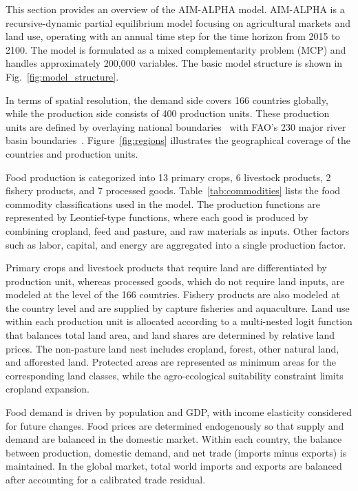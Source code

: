This section provides an overview of the AIM-ALPHA model. AIM-ALPHA is a recursive-dynamic partial equilibrium model 
focusing on agricultural markets and land use, operating with an annual time step for the time horizon from 2015 to 2100.
The model is formulated as a mixed complementarity problem (MCP) and handles approximately 200,000 variables. 
The basic model structure is shown in Fig.~\ref{fig:model_structure}.

In terms of spatial resolution, the demand side covers 166 countries globally, while the production side consists of 400 production units. 
These production units are defined by overlaying national boundaries~\cite{worldbankWorldBankOfficial2025} with FAO's 230 major river basin boundaries~\cite{faolandandwaterdivisionMajorHydrologicalBasins2011}. 
Figure~\ref{fig:regions} illustrates the geographical coverage of the countries and production units.

Food production is categorized into 13 primary crops, 6 livestock products, 2 fishery products, and 7 processed goods. Table~\ref{tab:commodities} lists the food commodity classifications used in the model. 
The production functions are represented by Leontief-type functions, where each good is produced by combining cropland, feed and pasture, 
and raw materials as inputs. Other factors such as labor, capital, and energy are aggregated into a single production factor. 

Primary crops and livestock products that require land are differentiated by production unit, whereas processed goods, which do not require 
land inputs, are modeled at the level of the 166 countries. Fishery products are also modeled at the country level and are supplied by capture fisheries and aquaculture. Land use within each production unit is allocated according to a multi-nested 
logit function that balances total land area, and land shares are determined by relative land prices. The non-pasture land nest includes
cropland, forest, other natural land, and afforested land. Protected areas are represented as minimum areas for the corresponding land classes,
while the agro-ecological suitability constraint limits cropland expansion.

Food demand is driven by population and GDP, with income elasticity considered for future changes. Food prices are determined endogenously 
so that supply and demand are balanced in the domestic market. Within each country, the balance between production, domestic demand, and net trade 
(imports minus exports) is maintained. In the global market, total world imports and exports are balanced after accounting for a calibrated trade residual. 

